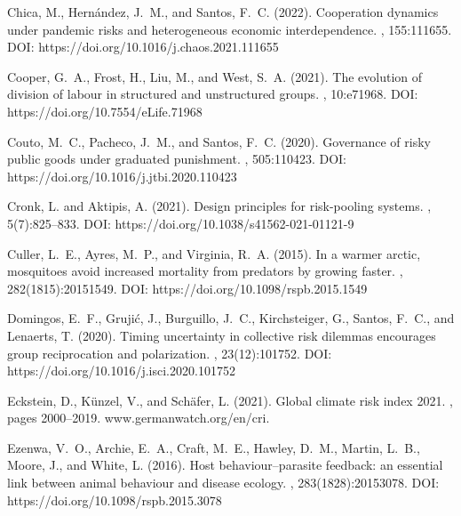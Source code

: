 \documentclass[9pt]{elife}
\begin{document}
\begin{thebibliography}{}
Chica, M., Hern{\'a}ndez, J.~M., and Santos, F.~C. (2022).
\newblock Cooperation dynamics under pandemic risks and heterogeneous economic
  interdependence.
, 155:111655. DOI: https://doi.org/10.1016/j.chaos.2021.111655

Cooper, G.~A., Frost, H., Liu, M., and West, S.~A. (2021).
\newblock The evolution of division of labour in structured and unstructured
  groups.
, 10:e71968. DOI: https://doi.org/10.7554/eLife.71968

Couto, M.~C., Pacheco, J.~M., and Santos, F.~C. (2020).
\newblock Governance of risky public goods under graduated punishment.
, 505:110423. DOI: https://doi.org/10.1016/j.jtbi.2020.110423

Cronk, L. and Aktipis, A. (2021).
\newblock Design principles for risk-pooling systems.
, 5(7):825--833. DOI: https://doi.org/10.1038/s41562-021-01121-9

Culler, L.~E., Ayres, M.~P., and Virginia, R.~A. (2015).
\newblock In a warmer arctic, mosquitoes avoid increased mortality from
  predators by growing faster.
,
  282(1815):20151549. DOI: https://doi.org/10.1098/rspb.2015.1549

Domingos, E.~F., Gruji{\'c}, J., Burguillo, J.~C., Kirchsteiger, G., Santos,
  F.~C., and Lenaerts, T. (2020).
\newblock Timing uncertainty in collective risk dilemmas encourages group
  reciprocation and polarization.
, 23(12):101752. DOI: https://doi.org/10.1016/j.isci.2020.101752

Eckstein, D., K{\"u}nzel, V., and Sch{\"a}fer, L. (2021).
\newblock Global climate risk index 2021.
, pages 2000--2019.
  www.germanwatch.org/en/cri.

Ezenwa, V.~O., Archie, E.~A., Craft, M.~E., Hawley, D.~M., Martin, L.~B.,
  Moore, J., and White, L. (2016).
\newblock Host behaviour--parasite feedback: an essential link between animal
  behaviour and disease ecology.
,
  283(1828):20153078. DOI: https://doi.org/10.1098/rspb.2015.3078


\end{thebibliography}
\end{document}
